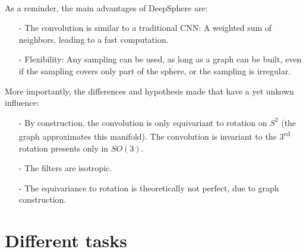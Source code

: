 \documentclass[11pt]{report}
\begin{document}
\paragraph*{}
As a reminder, the main advantages of DeepSphere are: 
\begin{itemize}
\setlength\itemsep{0.07em}
    \item[-] The convolution is similar to a traditional CNN: A weighted sum of neighbors, leading to a fast computation.
    \item[-] Flexibility: Any sampling can be used, as long as a graph can be built, even if the sampling covers only part of the sphere, or the sampling is irregular.
\end{itemize}


More importantly, the differences and hypothesis made that have a yet unkown influence:
\begin{itemize}
\setlength\itemsep{0.07em}
    \item[-] By construction, the convolution is only equivariant to rotation on $S^2$ (the graph approximates this manifold). The convolution is invariant to the 3\textsuperscript{rd} rotation presents only in $SO(3)$.
    \item[-] The filters are isotropic.
    \item[-] The equivariance to rotation is theoretically not perfect, due to graph construction.
\end{itemize}




\section{Different tasks} \label{sec:tasks}
\end{document}
